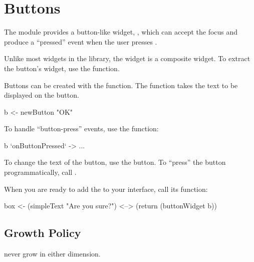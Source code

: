 \section{Buttons}

The  module provides a button-like widget, ,
which can accept the focus and produce a ``pressed'' event when the
user presses .

Unlike most widgets in the library, the  widget is a
composite widget.  To extract the button's widget, use the
 function.

Buttons can be created with the  function.  The function
takes the text to be displayed on the button.

\begin{haskellcode}
 b <- newButton "OK"
\end{haskellcode}

To handle ``button-press'' events, use the 
function:

\begin{haskellcode}
 b `onButtonPressed` \this ->
   ...
\end{haskellcode}

To change the text of the button, use the  button.
To ``press'' the button programmatically, call .

When you are ready to add the  to your interface, call its
 function:

\begin{haskellcode}
 box <- (simpleText "Are you sure?") <--> (return (buttonWidget b))
\end{haskellcode}

\subsection{Growth Policy}

 never grow in either dimension.

